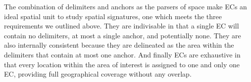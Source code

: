 
The combination of delimiters and anchors as the parsers of space make ECs an
ideal spatial unit to study spatial signatures, one which
meets the three requirements we outlined above.
%
They are indivisable in that a single EC will contain no delimiters, at most a
single anchor, and potentially none.
%
They are also internally consistent because they are delineated as the area
within the delimiters that contain at most one anchor.
%
And finally ECs are exhaustive in that every location within the area of
interest is assigned to one and only one EC, providing full geographical
coverage without any overlap.
